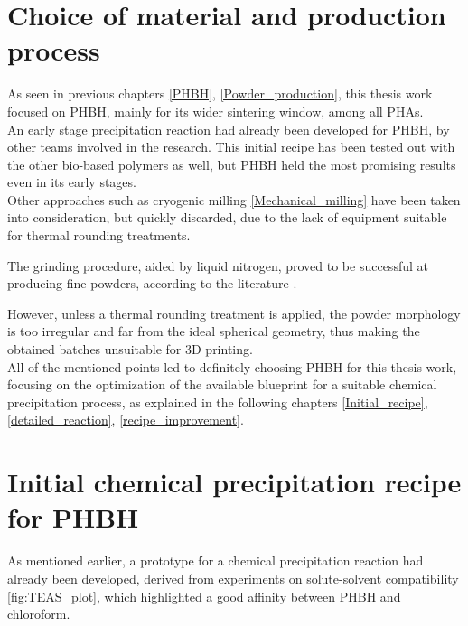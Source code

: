 \documentclass{article}
\begin{document}
    \clearpage
    \section{Choice of material and production process\label{Choice_material_process}}

    As seen in previous chapters \ref{PHBH}, \ref{Powder_production}, this thesis work focused on PHBH, mainly for its wider sintering window, among all PHAs. \\ 

    An early stage precipitation reaction had already been developed for PHBH, by other teams involved in the research. 
    This initial recipe has been tested out with the other bio-based polymers as well, but PHBH held the most promising 
    results even in its early stages. \\ 

    Other approaches such as cryogenic milling \ref{Mechanical_milling} have been taken into consideration, but quickly 
    discarded, due to the lack of equipment suitable for thermal rounding treatments. 

    The grinding procedure, aided by liquid nitrogen, proved to be successful at producing fine powders, according to the literature \autocites{Dechet_Schmidt_thermal_rounding}. 

    However, unless a thermal rounding treatment is applied, the powder 
    morphology is too irregular and far from the ideal spherical geometry, thus making the 
    obtained batches unsuitable for 3D printing. \\  

    All of the mentioned points led to definitely choosing PHBH for this thesis work, focusing on the optimization of 
    the available blueprint for a suitable chemical 
    precipitation process, as explained in the following chapters \ref{Initial_recipe}, \ref{detailed_reaction}, \ref{recipe_improvement}. 

    \clearpage
    \section{Initial chemical precipitation recipe for PHBH\label{Initial_recipe}}
    
    As mentioned earlier, a prototype for a chemical precipitation reaction had already been developed, 
    derived from experiments on solute-solvent compatibility \ref{fig:TEAS_plot}, 
    which highlighted a good affinity between PHBH and chloroform. \\ 
\end{document}
